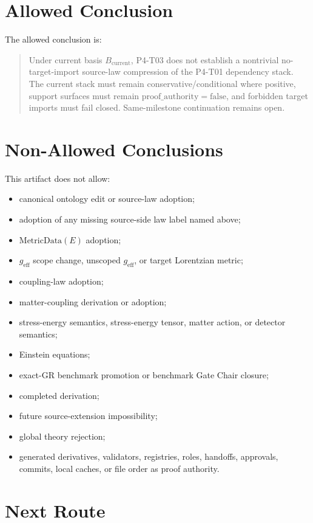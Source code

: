 \documentclass[11pt]{article}
\newcommand{\MetricData}{\mathrm{MetricData}}
\newcommand{\geff}{g_{\mathrm{eff}}}
\newcommand{\Bcur}{B_{\mathrm{current}}}
\newcommand{\ProofAuthFalse}{\mathrm{proof\_authority=false}}
\begin{document}
\section{Allowed Conclusion}

The allowed conclusion is:

\begin{quote}
Under current basis \(\Bcur\), P4-T03 does not establish a nontrivial
no-target-import source-law compression of the P4-T01 dependency stack. The
current stack must remain conservative/conditional where positive, support
surfaces must remain \(\ProofAuthFalse\), and forbidden target imports must
fail closed. Same-milestone continuation remains open.
\end{quote}

\section{Non-Allowed Conclusions}

This artifact does not allow:

\begin{itemize}[leftmargin=*]
\item canonical ontology edit or source-law adoption;
\item adoption of any missing source-side law label named above;
\item \(\MetricData(E)\) adoption;
\item \(\geff\) scope change, unscoped \(\geff\), or target Lorentzian metric;
\item coupling-law adoption;
\item matter-coupling derivation or adoption;
\item stress-energy semantics, stress-energy tensor, matter action, or
  detector semantics;
\item Einstein equations;
\item exact-GR benchmark promotion or benchmark Gate Chair closure;
\item completed derivation;
\item future source-extension impossibility;
\item global theory rejection;
\item generated derivatives, validators, registries, roles, handoffs,
  approvals, commits, local caches, or file order as proof authority.
\end{itemize}

\section{Next Route}
\end{document}
